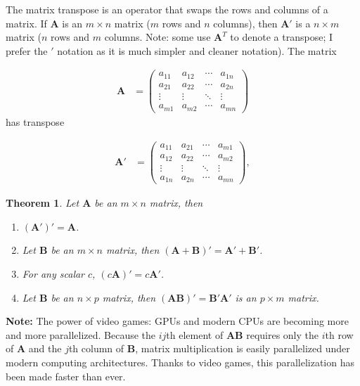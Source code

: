 \documentclass[
]{book}
\newtheorem{theorem}{Theorem}[chapter]
\theoremstyle{definition}
\theoremstyle{definition}
\theoremstyle{definition}
\theoremstyle{definition}
\theoremstyle{remark}
\begin{document}
The matrix transpose is an operator that swaps the rows and columns of a matrix. If \(\mathbf{A}\) is an \(m \times n\) matrix (\(m\) rows and \(n\) columns), then \(\mathbf{A}'\) is a \(n \times m\) matrix (\(n\) rows and \(m\) columns. Note: some use \(\mathbf{A}^T\) to denote a transpose; I prefer the \('\) notation as it is much simpler and cleaner notation). The matrix

\[
\begin{aligned}
\mathbf{A} & = \begin{pmatrix} a_{11} & a_{12} & \cdots & a_{1n} \\
a_{21} & a_{22} & \cdots & a_{2n} \\
\vdots & \vdots & \ddots & \vdots \\
a_{m1} & a_{m2} & \cdots & a_{mn}
\end{pmatrix}
\end{aligned}
\]
has transpose

\[
\begin{aligned}
\mathbf{A}' & = \begin{pmatrix} a_{11} & a_{21} & \cdots & a_{m1} \\
a_{12} & a_{22} & \cdots & a_{m2} \\
\vdots & \vdots & \ddots & \vdots \\
a_{1n} & a_{2n} & \cdots & a_{mn}
\end{pmatrix},
\end{aligned}
\]

\begin{theorem}

Let \(\mathbf{A}\) be an \(m \times n\) matrix, then

\begin{enumerate}
\def\labelenumi{\arabic{enumi})}
\item
  \((\mathbf{A}')' = \mathbf{A}\).
\item
  Let \(\mathbf{B}\) be an \(m \times n\) matrix, then \((\mathbf{A} + \mathbf{B})' = \mathbf{A}' + \mathbf{B}'\).
\item
  For any scalar \(c\), \((c \mathbf{A})' = c \mathbf{A}'\).
\item
  Let \(\mathbf{B}\) be an \(n \times p\) matrix, then \(( \mathbf{A} \mathbf{B})' = \mathbf{B}' \mathbf{A}'\) is an \(p \times m\) matrix.
\end{enumerate}

\end{theorem}

\textbf{Note:} The power of video games: GPUs and modern CPUs are becoming more and more parallelized. Because the \(ij\)th element of \(\mathbf{A}\mathbf{B}\) requires only the \(i\)th row of \(\mathbf{A}\) and the \(j\)th column of \(\mathbf{B}\), matrix multiplication is easily parallelized under modern computing architectures. Thanks to video games, this parallelization has been made faster than ever.
\end{document}
